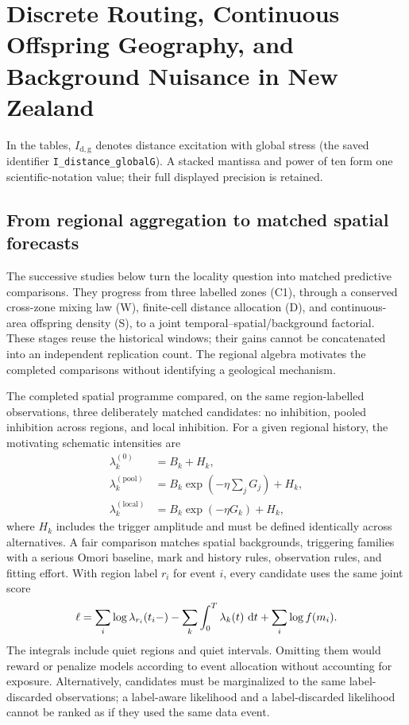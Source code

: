 \chapter{Discrete Routing, Continuous Offspring Geography, and Background Nuisance in New Zealand}

In the tables, $I_{\mathrm{d,g}}$ denotes distance excitation with global stress (the saved identifier \texttt{I\_distance\_globalG}). A stacked mantissa and power of ten form one scientific-notation value; their full displayed precision is retained.
\label{ch:nz-spatial}
\section{From regional aggregation to matched spatial forecasts}
The successive studies below turn the locality question into matched predictive comparisons. They progress from three labelled zones (C1), through a conserved cross-zone mixing law (W), finite-cell distance allocation (D), and continuous-area offspring density (S), to a joint temporal--spatial/background factorial. These stages reuse the historical windows; their gains cannot be concatenated into an independent replication count. The regional algebra motivates the completed comparisons without identifying a geological mechanism.

The completed spatial programme compared, on the same region-labelled observations, three deliberately matched candidates: no inhibition, pooled inhibition across regions, and local inhibition. For a given regional history, the motivating schematic intensities are
\begin{align}
  \lambda_k^{(0)}&=B_k+H_k, \label{eq:locality-none}\\
  \lambda_k^{(\mathrm{pool})}
    &=B_k\exp\!\left(-\eta\sum_jG_j\right)+H_k, \label{eq:locality-pooled}\\
  \lambda_k^{(\mathrm{local})}
    &=B_k\exp(-\eta G_k)+H_k, \label{eq:locality-local}
\end{align}
where \(H_k\) includes the trigger amplitude and must be defined identically across alternatives. A fair comparison matches spatial backgrounds, triggering families with a serious Omori baseline, mark and history rules, observation rules, and fitting effort. With region label \(r_i\) for event \(i\), every candidate uses the same joint score
\begin{equation}
 \ell=\sum_i\log\lambda_{r_i}(t_i-)
      -\sum_k\int_0^T\lambda_k(t)\,\mathop{}\!\mathrm{d} t
      +\sum_i\log f(m_i).
 \label{eq:proposed-spatial-score}
\end{equation}
The integrals include quiet regions and quiet intervals. Omitting them would reward or penalize models according to event allocation without accounting for exposure. Alternatively, candidates must be marginalized to the same label-discarded observations; a label-aware likelihood and a label-discarded likelihood cannot be ranked as if they used the same data event.


